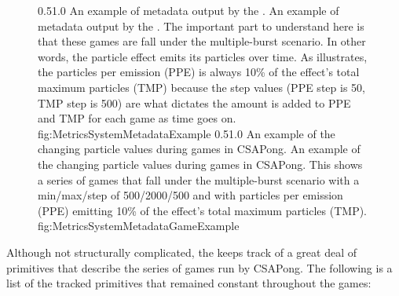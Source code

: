 \begin{figure}
\addtocounter{figure}{-1}
	{0.5}{1.0}
	{An example of metadata output by the .}
	{An example of metadata output by the . The important part to understand here is that these games are fall under the multiple-burst scenario. In other words, the particle effect emits its particles over time. As  illustrates, the particles per emission (PPE) is always 10\% of the effect's total maximum particles (TMP) because the step values (PPE step is 50, TMP step is 500) are what dictates the amount is added to PPE and TMP for each game as time goes on.}
	{fig:MetricsSystemMetadataExample}
	{0.5}{1.0}
	{An example of the changing particle values during games in CSAPong.}
	{An example of the changing particle values during games in CSAPong. This shows a series of games that fall under the multiple-burst scenario with a min/max/step of 500/2000/500 and with particles per emission (PPE) emitting 10\% of the effect's total maximum particles (TMP).}
	{fig:MetricsSystemMetadataGameExample}
\end{figure}


Although not structurally complicated, the  keeps track of a great deal of primitives that describe the series of games run by CSAPong. The following is a list of the tracked primitives that remained constant throughout the games:

